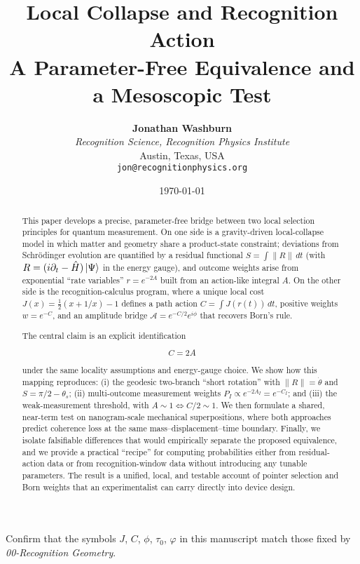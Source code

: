 \documentclass[11pt,letterpaper]{article}
\title{
  \vspace{-1cm}
  {\Huge\bfseries\color{maincolor} Local Collapse and Recognition Action}\\[0.5em]
  {\Large A Parameter-Free Equivalence and a Mesoscopic Test}
}
\author{
  \textbf{Jonathan Washburn}\\[0.3em]
  \textit{Recognition Science, Recognition Physics Institute}\\
  Austin, Texas, USA\\[0.2em]
  \texttt{jon@recognitionphysics.org}
}
\date{\today}
\begin{document}
\maketitle
\thispagestyle{fancy}

\begin{blockerbox}
Confirm that the symbols $J$, $C$, $\phi$, $\tau_0$, $\varphi$ in this manuscript match those fixed by \emph{00-Recognition Geometry}.
\end{blockerbox}

\begin{abstract}
\noindent
This paper develops a precise, parameter-free bridge between two local selection principles for quantum measurement. On one side is a gravity-driven local-collapse model in which matter and geometry share a product-state constraint; deviations from Schrödinger evolution are quantified by a residual functional $S=\int\|R\|\,dt$ (with $R=(i\partial_t-\hat H)\ket{\Psi}$ in the energy gauge), and outcome weights arise from exponential ``rate variables'' $r=e^{-2A}$ built from an action-like integral $A$. On the other side is the recognition-calculus program, where a unique local cost $J(x)=\frac{1}{2}(x+1/x)-1$ defines a path action $C=\int J(r(t))\,dt$, positive weights $w=e^{-C}$, and an amplitude bridge $\mathcal{A}=e^{-C/2}e^{i\phi}$ that recovers Born's rule.

The central claim is an explicit identification
\begin{keyequation}
\begin{equation}
\boxed{\quad C = 2A \quad}
\end{equation}
\end{keyequation}
\vspace{-0.5em}
\noindent under the same locality assumptions and energy-gauge choice. We show how this mapping reproduces: (i) the geodesic two-branch ``short rotation'' with $\|R\|=\dot{\theta}$ and $S=\pi/2-\theta_s$; (ii) multi-outcome measurement weights $P_I \propto e^{-2A_I}=e^{-C_I}$; and (iii) the weak-measurement threshold, with $A\sim 1 \Longleftrightarrow C/2\sim 1$. We then formulate a shared, near-term test on nanogram-scale mechanical superpositions, where both approaches predict coherence loss at the same mass--displacement--time boundary. Finally, we isolate falsifiable differences that would empirically separate the proposed equivalence, and we provide a practical ``recipe'' for computing probabilities either from residual-action data or from recognition-window data without introducing any tunable parameters. The result is a unified, local, and testable account of pointer selection and Born weights that an experimentalist can carry directly into device design.
\end{abstract}
\end{document}
